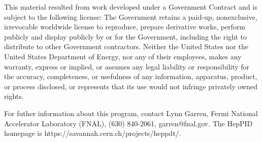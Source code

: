 This material resulted from work developed under a Government Contract
and is subject to the following license:  The Government retains a
paid-up, nonexclusive, irrevocable worldwide license to reproduce,
prepare derivative works, perform publicly and display publicly by or for
the Government,  including the right to distribute to other Government
contractors.  Neither the United States nor the United States Department
of Energy, nor any of their employees, makes any warranty, express or
implied, or assumes any legal liability or responsibility for the
accuracy, completeness, or usefulness of any  information, apparatus,
product, or process disclosed, or represents that its use would not
infringe privately owned rights.
 
For futher information about this program, contact Lynn Garren,
Fermi National Accelerator Laboratory (FNAL), (630) 840-2061,
garren@fnal.gov.  
The HepPID homepage is https://savannah.cern.ch/projects/heppdt/.

\newpage

\setcounter{page}{1}
\tableofcontents

\cleardoublepage
